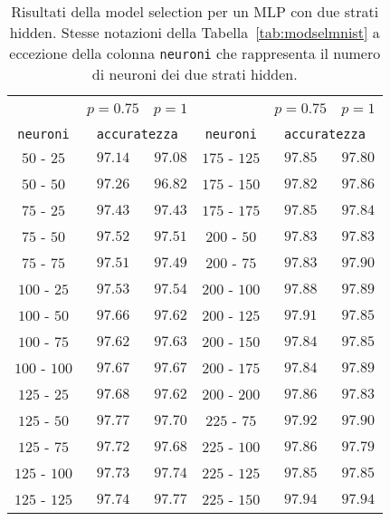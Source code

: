 \vspace*{\fill}
\begin{center}

\begin{table}[]
  \small
  \caption{Risultati della model selection per un MLP con due strati hidden. Stesse notazioni della Tabella~\ref{tab:modselmnist} a eccezione della colonna \texttt{neuroni} che rappresenta il numero di neuroni dei due strati hidden.}\label{tab:modselmnist2}
\begin{center}
\begin{tabular}{cc|c||cc|c}
\hline\\[-11pt]
\hline\\[-6.5pt]
& $p=0.75$ & $p=1$ & & $p=0.75$ & $p=1$ \\[5pt]
\hline\\[-11pt]
\texttt{neuroni} & \multicolumn{2}{c}{\texttt{accuratezza}} & \texttt{neuroni} & \multicolumn{2}{c}{\texttt{accuratezza}} \\[1pt]
$50$ - $25$   & $97.14$ & $97.08$ &  $175$ - $125$ & $97.85$ & $97.80$ \\ [1pt]
$50$ - $50$   & $97.26$ & $96.82$ &  $175$ - $150$ & $97.82$ & $97.86$ \\ [1pt]
$75$ - $25$   & $97.43$ & $97.43$ &  $175$ - $175$ & $97.85$ & $97.84$ \\ [1pt]
$75$ - $50$   & $97.52$ & $97.51$ &  $200$ - $50$  & $97.83$ & $97.83$ \\ [1pt]
$75$ - $75$   & $97.51$ & $97.49$ &  $200$ - $75$  & $97.83$ & $97.90$ \\ [1pt]
$100$ - $25$  & $97.53$ & $97.54$ &  $200$ - $100$ & $97.88$ & $97.89$ \\ [1pt]
$100$ - $50$  & $97.66$ & $97.62$ &  $200$ - $125$ & $97.91$ & $97.85$ \\ [1pt]
$100$ - $75$  & $97.62$ & $97.63$ &  $200$ - $150$ & $97.84$ & $97.85$ \\ [1pt]
$100$ - $100$ & $97.67$ & $97.67$ &  $200$ - $175$ & $97.84$ & $97.89$ \\ [1pt]
$125$ - $25$  & $97.68$ & $97.62$ &  $200$ - $200$ & $97.86$ & $97.83$ \\ [1pt]
$125$ - $50$  & $97.77$ & $97.70$ &  $225$ - $75$  & $97.92$ & $97.90$ \\ [1pt]
$125$ - $75$  & $97.72$ & $97.68$ &  $225$ - $100$ & $97.86$ & $97.79$ \\ [1pt]
$125$ - $100$ & $97.73$ & $97.74$ &  $225$ - $125$ & $97.85$ & $97.85$ \\ [1pt]
$125$ - $125$ & $97.74$ & $97.77$ &  $225$ - $150$ & $97.94$ & $97.94$ \\ [1pt]

\end{tabular}
\end{center}
\end{table}
\end{center}

